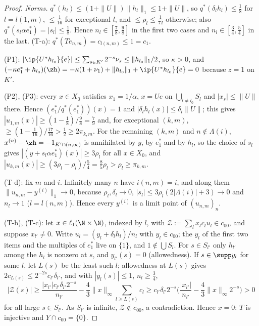 \begin{proof}
\emph{Norms.}  $q^*(h_l)\le(1+\|U\|)\|h_l\|_1\le1+\|U\|$, so
$q^*(\delta_lh_l)\le\frac18$ for $l=l(1,m)$, $\le\frac1{16}$ for exceptional
$l$, and $\le\rho_l\le\frac1{72}$ otherwise; also $q^*(s_l\alpha e_1^*)=
|s_l|\le\frac18$.  Hence $n_l\in[\frac78,\frac98]$ in the first two cases and
$n_l\in[\frac34,\frac54]$ in the last.  (T-a): $q^*(Te_{n,m})=c_{l(n,m)}\le1
=c_1$.

(P1): $|\ip{U^*h_{l_0}}{e}|\le\sum_{s\in K'}2^{-s}\nu_s\le\|h_{l_0}\|_1/2$, so
$\kappa>0$, and $(-\kappa e_1^*+h_{l_0})(\zh)=-\kappa(1+\nu_1)+\|h_{l_0}\|_1+
\ip{U^*h_{l_0}}{e}=0$ because $z=1$ on $K'$.

(P2), (P3): every $x\in X_0$ satisfies $x_1=1/\alpha$, $x=Ue$ on
$\bigcup_{l\ne l_0}S_l$ and $|x_s|\le\|U\|$ there.  Hence
$(e_1^*/q^*(e_1^*))(x)=1$ and $|\delta_lh_l(x)|\le\delta_l\|U\|$; this gives
$|u_{1,m}(x)|\ge(1-\frac18)/\frac98=\frac79$ and, for exceptional $(k,m)$,
$\ge(1-\frac1{16})/\frac{17}{16}>\frac12\ge2\pi_{k,m}$.  For the remaining
$(k,m)$ and $n\notin\Lambda(i)$, $x^{(n)}-\zh=-1_{K'\cap(n,\infty)}$ is
annihilated by $y$, by $e_1^*$ and by $h_l$, so the choice of $s_l$ gives
$|(y+s_l\alpha e_1^*)(x)|\ge3\rho_l$ for all $x\in X_0$, and
$|u_{k,m}(x)|\ge(3\rho_l-\rho_l)/\frac54=\frac85\rho_l>\rho_l\ge\pi_{k,m}$.

(T-d): fix $m$ and $i$.  Infinitely many $n$ have $i(n,m)=i$, and along
them $\|u_{n,m}-y^{(i)}\|_1\to0$, because $\rho_l,\delta_l\to0$,
$|s_l|\le3\rho_l(2|\Lambda(i)|+3)\to0$ and $n_l\to1$ ($l=l(n,m)$).  Hence
every $y^{(i)}$ is a limit point of $(u_{n,m})_n$.

(T-b), (T-c): let $x\in\ell_1(\N\times\N)$, indexed by $l$, with
$\mathcal Z:=\sum_lx_lc_lu_l\in c_{00}$, and suppose $x_{l'}\ne0$.  Write
$u_l=(y_l+\delta_lh_l)/n_l$ with $y_l\in c_{00}$; the $y_l$ of the first
two items and the multiples of $e_1^*$ live on $\{1\}$, and
$1\notin\bigcup S_l$.  For $s\in S_{l'}$ only $h_{l'}$ among the $h_l$ is
nonzero at $s$, and $y_{l'}(s)=0$ (allowedness).  If $s\in\supp y_l$ for
some $l$, let $L(s)$ be the least such $l$; allowedness at $L(s)$ gives
$2c_{L(s)}\le2^{-2s}c_{l'}\delta_{l'}$, and with $|y_l(s)|\le1$,
$n_l\ge\frac34$,
\[
 |\mathcal Z(s)|\ge\frac{|x_{l'}|c_{l'}\delta_{l'}2^{-s}}{n_{l'}}-\frac43
 \|x\|_\infty\sum_{l\ge L(s)}c_l\ge c_{l'}\delta_{l'}2^{-s}
 \Big(\frac{|x_{l'}|}{n_{l'}}-\frac43\|x\|_\infty2^{-s}\Big)>0
\]
for all large $s\in S_{l'}$.  As $S_{l'}$ is infinite, $\mathcal Z\notin c_{00}$,
a contradiction.  Hence $x=0$: $T$ is injective and $Y\cap c_{00}=\{0\}$.
\end{proof}

